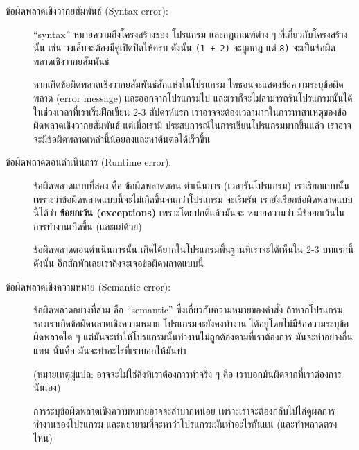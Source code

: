 \begin{description}

\item[ข้อผิดพลาดเชิงวากยสัมพันธ์ (Syntax error):] ``syntax'' หมายความถึงโครงสร้างของ
โปรแกรม และกฎเกณฑ์ต่าง ๆ ที่เกี่ยวกับโครงสร้างนั้น เช่น วงเล็บจะต้องมีคู่เปิดปิดให้ครบ ดังนั้น 
{\tt (1 + 2)}  จะถูกกฎ แต่ {\tt 8)} จะเป็นข้อผิดพลาดเชิงวากยสัมพันธ์ 
  
   
  
   

 หากเกิดข้อผิดพลาดเชิงวากยสัมพันธ์สักแห่งในโปรแกรม ไพธอนจะแสดงข้อความระบุข้อผิดพลาด (error 
 message) และออกจากโปรแกรมไป และเราก็จะไม่สามารถรันโปรแกรมนั้นได้ ในช่วงเวลาที่เราเริ่มฝึกเขียน 
 2-3 สัปดาห์แรก เราอาจจะต้องเวลามากในการหาสาเหตุของข้อผิดพลาดเชิงวากยสัมพันธ์ แต่เมื่อเรามี
 ประสบการณ์ในการเขียนโปรแกรมมากขึ้นแล้ว เราอาจจะมีข้อผิดพลาดเหล่านี้น้อยลงและหาต้นตอได้เร็วขึ้น


\item[ข้อผิดพลาดตอนดำเนินการ (Runtime error):] ข้อผิดพลาดแบบที่สอง คือ ข้อผิดพลาดตอน
ดำเนินการ (เวลารันโปรแกรม)  เราเรียกแบบนั้น เพราะว่าข้อผิดพลาดแบบนี้จะไม่เกิดขึ้นจนกว่าโปรแกรม
จะเริ่มรัน  เรายังเรียกข้อผิดพลาดแบบนี้ได้ว่า {\bf ข้อยกเว้น (exceptions)} เพราะโดยปกติแล้วมันจะ
หมายความว่า มีข้อยกเว้นในการทำงานเกิดขึ้น (และแย่ด้วย)
  
   
  
   

 ข้อผิดพลาดตอนดำเนินการนั้น เกิดได้ยากในโปรแกรมพื้นฐานที่เราจะได้เห็นใน 2-3 บทแรกนี้ 
 ดังนั้น อีกสักพักเลยเราถึงจะเจอข้อผิดพลาดแบบนี้


\item[ข้อผิดพลาดเชิงความหมาย (Semantic error):] ข้อผิดพลาดอย่างที่สาม คือ ``semantic'' 
ซึ่งเกี่ยวกับความหมายของคำสั่ง ถ้าหากโปรแกรมของเราเกิดข้อผิดพลาดเชิงความหมาย โปรแกรมจะยังคงทำงาน
ได้อยู่โดยไม่มีข้อความระบุข้อผิดพลาดใด ๆ  แต่มันจะทำให้โปรแกรมนั้นทำงานไม่ถูกต้องตามที่เราต้องการ 
มันจะทำอย่างอื่นแทน นั่นคือ มันจะทำอะไรที่เราบอกให้มันทำ 

(หมายเหตุผู้แปล: อาจจะไม่ใช่สิ่งที่เราต้องการทำจริง ๆ คือ เราบอกมันผิดจากที่เราต้องการนั่นเอง)
   
   

การระบุข้อผิดพลาดเชิงความหมายอาจจะลำบากหน่อย เพราะเราจะต้องกลับไปไล่ดูผลการทำงานของโปรแกรม
และพยายามที่จะหาว่าโปรแกรมมันทำอะไรกันแน่ (และทำพลาดตรงไหน)

\end{description}



